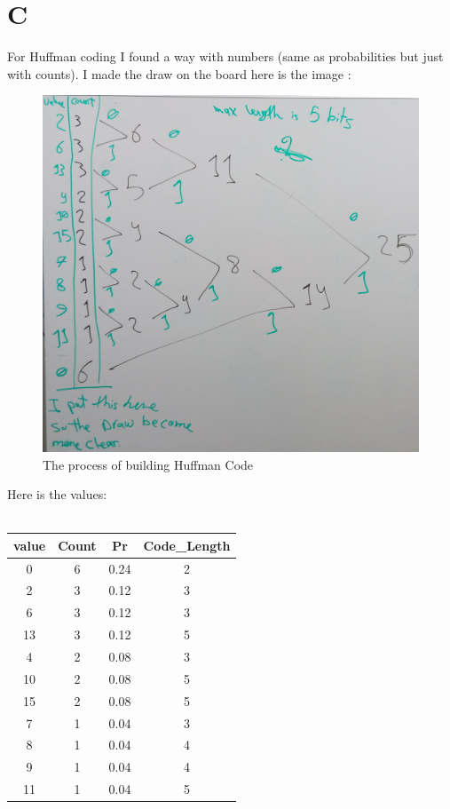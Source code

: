 \documentclass{article}
\begin{document}
 \section *{C}
For Huffman coding I found a way with numbers (same as probabilities but just with counts). I made the draw on the board here is the image :
\begin{figure}[H]
\includegraphics[scale=0.2]{c_modified.jpg}
\caption{The process of building Huffman Code}
\end{figure}
Here is the values:\\ \\ 
\begin{tabular}{|c|c|c|c|}
\hline
value&Count&Pr&Code\_Length\\ \hline 
0&6&0.24&2\\ \hline 
2&3&0.12&3\\ \hline 
6&3&0.12&3\\ \hline 
13&3&0.12&5\\ \hline 
4&2&0.08&3\\ \hline 
10&2&0.08&5\\ \hline 
15&2&0.08&5\\ \hline 
7&1&0.04&3\\ \hline 
8&1&0.04&4\\ \hline 
9&1&0.04&4\\ \hline 
11&1&0.04&5\\ \hline
\end{tabular} \\
\end{document}
